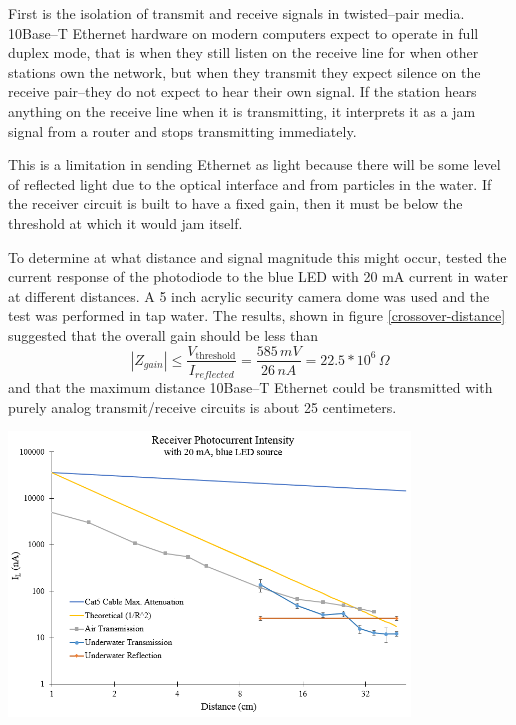 \documentclass{article}
\begin{document}
First is the isolation of transmit and receive signals in twisted--pair media.
10Base--T Ethernet hardware on modern computers expect to operate in full
duplex mode, that is when they still listen on the receive line for when
other stations own the network, but when they transmit they expect silence
on the receive pair--they do not expect to hear their own signal.
If the station hears anything on the receive line when it is transmitting,
it interprets it as a jam signal from a router and stops transmitting immediately.

This is a limitation in sending Ethernet as light because there will be some
level of reflected light due to the optical interface and from particles in the water.
If the receiver circuit is built to have a fixed gain, then it must be below
the threshold at which it would jam itself.

To determine at what distance and signal magnitude this might occur,
tested the current response of the photodiode to the blue LED with 20 mA current
in water at different distances.
A 5 inch acrylic security camera dome was used and the test was performed in
tap water.
The results, shown in figure \ref{crossover-distance} suggested that the overall gain
should be less than
\begin{equation}
|Z_{gain}| \leq \frac{V_{\textrm{threshold}}}{I_{reflected}}=\frac{585\,mV}{26\,nA}=22.5*10^{6}\,\Omega
\end{equation}
and that the maximum distance 10Base--T Ethernet could be transmitted with purely analog transmit/receive
circuits is about 25 centimeters.

\begin{center}
	\includegraphics[width=0.8\textwidth]{crossover_distance.png}
	\label{crossover-distance}
\end{center}
\end{document}
